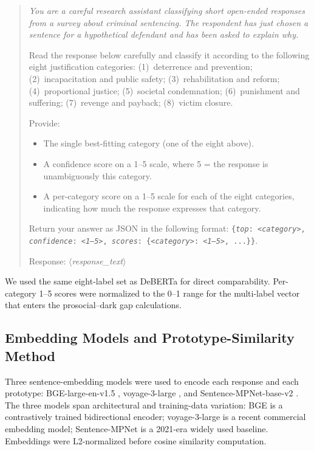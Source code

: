 \begin{quote}\small\itshape
You are a careful research assistant classifying short open-ended responses from a survey about criminal sentencing. The respondent has just chosen a sentence for a hypothetical defendant and has been asked to explain why.

Read the response below carefully and classify it according to the following eight justification categories: (1)~deterrence and prevention; (2)~incapacitation and public safety; (3)~rehabilitation and reform; (4)~proportional justice; (5)~societal condemnation; (6)~punishment and suffering; (7)~revenge and payback; (8)~victim closure.

Provide:
\begin{itemize}\itemsep -0.3em
  \item The single best-fitting category (one of the eight above).
  \item A confidence score on a 1--5 scale, where 5 = the response is unambiguously this category.
  \item A per-category score on a 1--5 scale for each of the eight categories, indicating how much the response expresses that category.
\end{itemize}

Return your answer as JSON in the following format: \texttt{\{\textit{top}: \textit{<category>}, \textit{confidence}: \textit{<1--5>}, \textit{scores}: \{\textit{<category>}: \textit{<1--5>}, ...\}\}}.

Response: $\langle$\textit{response\_text}$\rangle$
\end{quote}

We used the same eight-label set as DeBERTa for direct comparability. Per-category 1--5 scores were normalized to the 0--1 range for the multi-label vector that enters the prosocial--dark gap calculations.

\subsection{Embedding Models and Prototype-Similarity Method}
\label{sec:supp_embeddings}

Three sentence-embedding models were used to encode each response and each prototype: BGE-large-en-v1.5 \citep{xiao2024bge}, voyage-3-large \citep{voyageai2024}, and Sentence-MPNet-base-v2 \citep{song2020mpnet, reimers2019sentence}. The three models span architectural and training-data variation: BGE is a contrastively trained bidirectional encoder; voyage-3-large is a recent commercial embedding model; Sentence-MPNet is a 2021-era widely used baseline. Embeddings were L2-normalized before cosine similarity computation.

